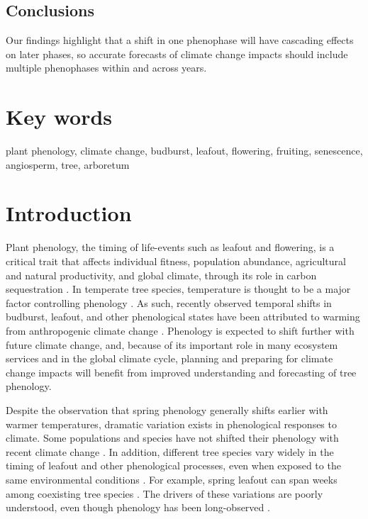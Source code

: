 \documentclass{article}
\begin{document}
\subsection*{Conclusions}
Our findings highlight that a shift in one phenophase will have cascading effects on later phases, so accurate forecasts of climate change impacts should include multiple phenophases within and across years. 

\section* {Key words}
plant phenology, climate change, budburst, leafout, flowering, fruiting, senescence, angiosperm, tree, arboretum
\section* {Introduction}
Plant phenology, the timing of life-events such as leafout and flowering, is a critical trait that affects individual fitness, population abundance, agricultural and natural productivity, and global climate, through its role in carbon sequestration \citep{miller-rushing2008,primack2009a,willis2010,miller-rushing2010}. In temperate tree species, temperature is thought to be a major factor controlling phenology \citep{parmesan2006, morin2010,schwartz2013}. As such, recently observed temporal shifts in budburst, leafout, and other phenological states have been attributed to warming from anthropogenic climate change \citep{parmesan2006}. Phenology is expected to shift further with future climate change, and, because of its important role in many ecosystem services and in the global climate cycle, planning and preparing for climate change impacts will benefit from improved understanding and forecasting of tree phenology.
\par Despite the observation that spring phenology generally shifts earlier with warmer temperatures, dramatic variation exists in phenological responses to climate. Some populations and species have not shifted their phenology with recent climate change \citep{wolkovich2012}. In addition, different tree species vary widely in the timing of leafout and other phenological processes, even when exposed to the same environmental conditions \citep{lechowicz1984,primack2009c}. For example, spring leafout can span weeks among coexisting tree species \citep{lechowicz1984}. The drivers of these variations are poorly understood, even though phenology has been long-observed \citep{wolkovich2014}.
\end{document}
